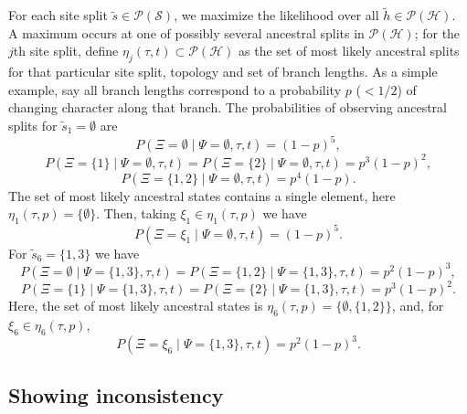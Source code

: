 \documentclass[a4paper]{article}
\newcommand{\siteSplit}{\tilde{s}}
\newcommand{\siteSplitSet}{\mathcal{S}}
\newcommand{\ancestralSplit}{\tilde{h}}
\newcommand{\ancestralSplitSet}{\mathcal{H}}
\newcommand{\ancestralSplitPartition}{\eta}
\newcommand{\siteSplitRV}{\Psi}
\newcommand{\ancestralSplitRV}{\Xi}
\begin{document}
For each site split $\siteSplit\in\mathcal{P}(\siteSplitSet)$, we maximize the likelihood over all $\ancestralSplit\in\mathcal{P}(\ancestralSplitSet)$.
A maximum occurs at one of possibly several ancestral splits in $\mathcal{P}(\ancestralSplitSet)$; for the $j$th site split, define $\ancestralSplitPartition_j(\tau, t)\subset\mathcal{P}(\ancestralSplitSet)$ as the set of most likely ancestral splits for that particular site split, topology and set of branch lengths.
As a simple example, say all branch lengths correspond to a probability $p$ ($< 1/2$) of changing character along that branch.
The probabilities of observing ancestral splits for $\siteSplit_1=\emptyset$ are
$$
P(\ancestralSplitRV=\emptyset \mid \siteSplitRV=\emptyset, \tau, t) =
(1-p)^5,
$$
$$
P(\ancestralSplitRV=\{1\} \mid \siteSplitRV=\emptyset, \tau, t) =
P(\ancestralSplitRV=\{2\} \mid \siteSplitRV=\emptyset, \tau, t) =
p^3(1-p)^2,
$$
$$
P(\ancestralSplitRV=\{1,2\} \mid \siteSplitRV=\emptyset, \tau, t) =
p^4(1-p).
$$
The set of most likely ancestral states contains a single element, here $\ancestralSplitPartition_1(\tau, p)=\{\emptyset\}$.
Then, taking $\xi_1\in\ancestralSplitPartition_1(\tau, p)$ we have
$$
P(\ancestralSplitRV=\xi_1 \mid \siteSplitRV=\emptyset, \tau, t) =
(1-p)^5.
$$
For $\siteSplit_6=\{1,3\}$ we have
$$
P(\ancestralSplitRV=\emptyset \mid \siteSplitRV=\{1,3\}, \tau, t) =
P(\ancestralSplitRV=\{1,2\} \mid \siteSplitRV=\{1,3\}, \tau, t) =
p^2(1-p)^3,
$$
$$
P(\ancestralSplitRV=\{1\} \mid \siteSplitRV=\{1,3\}, \tau, t) =
P(\ancestralSplitRV=\{2\} \mid \siteSplitRV=\{1,3\}, \tau, t) =
p^3(1-p)^2.
$$
Here, the set of most likely ancestral states is $\ancestralSplitPartition_6(\tau, p)=\{\emptyset,\{1,2\}\}$, and, for $\xi_6\in\ancestralSplitPartition_6(\tau, p)$,
$$
P(\ancestralSplitRV=\xi_6 \mid \siteSplitRV=\{1,3\}, \tau, t) =
p^2(1-p)^3.
$$

\subsection{Showing inconsistency}
\end{document}
